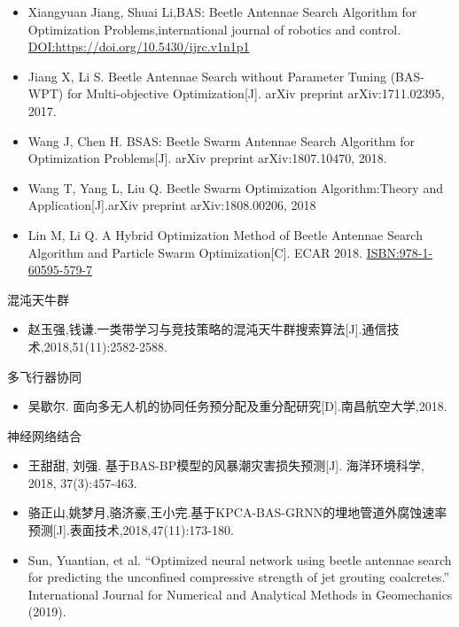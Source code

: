 \documentclass[]{ctexbook}
\providecommand{\tightlist}{%
  \setlength{\itemsep}{0pt}\setlength{\parskip}{0pt}}
\begin{document}
\begin{itemize}
\tightlist
\item
  Xiangyuan Jiang, Shuai Li,BAS: Beetle Antennae Search Algorithm for
  Optimization Problems,international journal of robotics and control.
  \url{DOI:https://doi.org/10.5430/ijrc.v1n1p1}
\item
  Jiang X, Li S. Beetle Antennae Search without Parameter Tuning
  (BAS-WPT) for Multi-objective Optimization{[}J{]}. arXiv preprint
  arXiv:1711.02395, 2017.
\item
  Wang J, Chen H. BSAS: Beetle Swarm Antennae Search Algorithm for
  Optimization Problems{[}J{]}. arXiv preprint arXiv:1807.10470, 2018.
\item
  Wang T, Yang L, Liu Q. Beetle Swarm Optimization Algorithm:Theory and
  Application{[}J{]}.arXiv preprint arXiv:1808.00206, 2018
\item
  Lin M, Li Q. A Hybrid Optimization Method of Beetle Antennae Search
  Algorithm and Particle Swarm Optimization{[}C{]}. ECAR 2018.
  \url{ISBN:978-1-60595-579-7}
\end{itemize}

混沌天牛群

\begin{itemize}
\tightlist
\item
  赵玉强,钱谦.一类带学习与竞技策略的混沌天牛群搜索算法{[}J{]}.通信技术,2018,51(11):2582-2588.
\end{itemize}

多飞行器协同

\begin{itemize}
\tightlist
\item
  吴歇尔.
  面向多无人机的协同任务预分配及重分配研究{[}D{]}.南昌航空大学,2018.
\end{itemize}

神经网络结合

\begin{itemize}
\tightlist
\item
  王甜甜, 刘强. 基于BAS-BP模型的风暴潮灾害损失预测{[}J{]}. 海洋环境科学,
  2018, 37(3):457-463.
\item
  骆正山,姚梦月,骆济豪,王小完.基于KPCA-BAS-GRNN的埋地管道外腐蚀速率预测{[}J{]}.表面技术,2018,47(11):173-180.
\item
  Sun, Yuantian, et al. ``Optimized neural network using beetle antennae
  search for predicting the unconfined compressive strength of jet
  grouting coalcretes.'' International Journal for Numerical and
  Analytical Methods in Geomechanics (2019).
\end{itemize}
\end{document}
